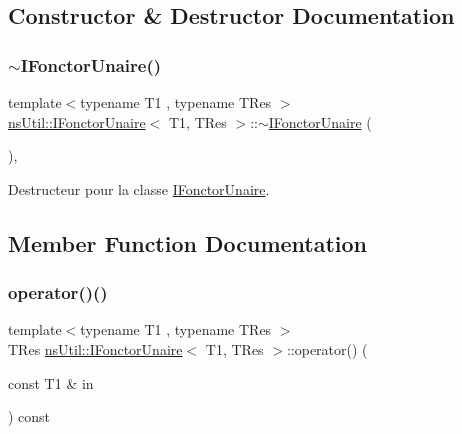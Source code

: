 \subsection{Constructor \& Destructor Documentation}
\mbox{\label{classns_util_1_1_i_fonctor_unaire_ae41ac6b220f0afa4b0860e92c27b3cd1}} 
\subsubsection{\texorpdfstring{$\sim$\+I\+Fonctor\+Unaire()}{~IFonctorUnaire()}}
{\footnotesize\ttfamily template$<$typename T1 , typename T\+Res $>$ \\
\hyperlink{classns_util_1_1_i_fonctor_unaire}{ns\+Util\+::\+I\+Fonctor\+Unaire}$<$ T1, T\+Res $>$\+::$\sim$\hyperlink{classns_util_1_1_i_fonctor_unaire}{I\+Fonctor\+Unaire} (\begin{DoxyParamCaption}{ }\end{DoxyParamCaption})\hspace{0.3cm}{\ttfamily [virtual]}, {\ttfamily [default]}}



Destructeur pour la classe \hyperlink{classns_util_1_1_i_fonctor_unaire}{I\+Fonctor\+Unaire}. 



\subsection{Member Function Documentation}
\mbox{\label{classns_util_1_1_i_fonctor_unaire_a2f53e65b0a64a4eb543a709eb72ed3ab}} 
\subsubsection{\texorpdfstring{operator()()}{operator()()}}
{\footnotesize\ttfamily template$<$typename T1 , typename T\+Res $>$ \\
T\+Res \hyperlink{classns_util_1_1_i_fonctor_unaire}{ns\+Util\+::\+I\+Fonctor\+Unaire}$<$ T1, T\+Res $>$\+::operator() (\begin{DoxyParamCaption}\item[{const T1 \&}]{in }\end{DoxyParamCaption}) const\hspace{0.3cm}{\ttfamily [pure virtual]}}



